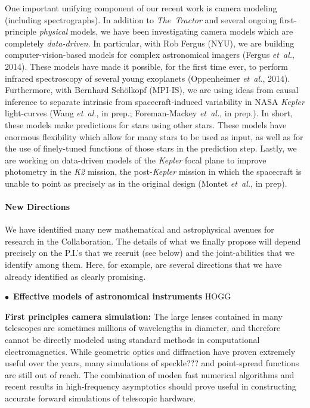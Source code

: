 \documentclass[12pt]{article}
\newcommand{\foreign}[1]{\textsl{#1}}
\newcommand{\etal}{\foreign{et~al.}}
\newcommand{\project}[1]{\textsl{#1}}
\newcommand{\hoggitem}{$\bullet$}
\begin{document}
One important unifying component of our recent work is camera modeling
(including spectrographs).
In addition to \project{The~Tractor} and several ongoing first-principle
{\em physical} models, we have been investigating camera models which
are completely {\em data-driven}.
In particular, with Rob Fergus (NYU), we are building
computer-vision-based models for complex astronomical imagers (Fergus
\etal, 2014).
These models have made it possible, for the first time ever, to perform
infrared spectroscopy of several young exoplanets (Oppenheimer \etal,
2014).
Furthermore, with Bernhard Sch\"olkopf (MPI-IS), we are using ideas from
causal inference to separate intrinsic from spacecraft-induced
variability in NASA \project{Kepler} light-curves (Wang \etal, in prep.;
Foreman-Mackey \etal, in prep.).
In short, these models make predictions for stars using other stars.
These models have enormous flexibility which allow for many stars to be
used as input, as well as for the use of finely-tuned functions of those
stars in the prediction step.
Lastly, we are working on data-driven models of the \project{Kepler}
focal plane to improve photometry in the \project{K2} mission, the
post-\project{Kepler} mission in which the spacecraft is unable to point
as precisely as in the original design (Montet \etal, in prep).




\paragraph{New Directions}

We have identified many new mathematical and astrophysical avenues for
research in the Collaboration.
The details of what we finally propose will depend precisely on the
P.I.'s that we recruit (see below) and the joint-abilities that we
identify among them.
Here, for example, are several directions that we have already
identified as clearly promising.

\hoggitem~\textbf{Effective models of astronomical instruments} HOGG

\textbf{First principles camera simulation:} 
The large lenses contained in many telescopes are sometimes millions of
wavelengths in diameter, and therefore cannot be directly modeled using
standard methods in computational electromagnetics.
While geometric optics and diffraction have proven extremely useful over
the years, many simulations of speckle??? and point-spread functions are
still out of reach.
The combination of moden fast numerical algorithms and recent results in
high-frequency asymptotics should prove useful in constructing accurate
forward simulations of telescopic hardware.  
\end{document}
